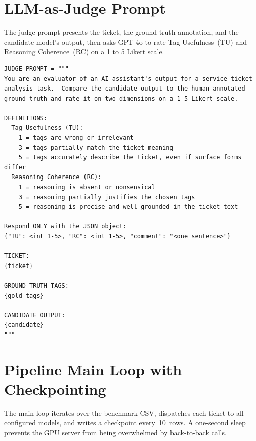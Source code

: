 \section{LLM-as-Judge Prompt}
\label{sec:app-judge-prompt}
%
The judge prompt presents the ticket, the ground-truth annotation, and the
candidate model's output, then asks GPT-4o to rate Tag Usefulness~(TU) and
Reasoning Coherence~(RC) on a 1 to 5 Likert scale.

\begin{verbatim}
JUDGE_PROMPT = """
You are an evaluator of an AI assistant's output for a service-ticket
analysis task.  Compare the candidate output to the human-annotated
ground truth and rate it on two dimensions on a 1-5 Likert scale.

DEFINITIONS:
  Tag Usefulness (TU):
    1 = tags are wrong or irrelevant
    3 = tags partially match the ticket meaning
    5 = tags accurately describe the ticket, even if surface forms differ
  Reasoning Coherence (RC):
    1 = reasoning is absent or nonsensical
    3 = reasoning partially justifies the chosen tags
    5 = reasoning is precise and well grounded in the ticket text

Respond ONLY with the JSON object:
{"TU": <int 1-5>, "RC": <int 1-5>, "comment": "<one sentence>"}

TICKET:
{ticket}

GROUND TRUTH TAGS:
{gold_tags}

CANDIDATE OUTPUT:
{candidate}
"""
\end{verbatim}

\section{Pipeline Main Loop with Checkpointing}
\label{sec:app-main-loop}
%
The main loop iterates over the benchmark CSV, dispatches each ticket to all
configured models, and writes a checkpoint every~10~rows.  A one-second
sleep prevents the GPU server from being overwhelmed by back-to-back calls.

